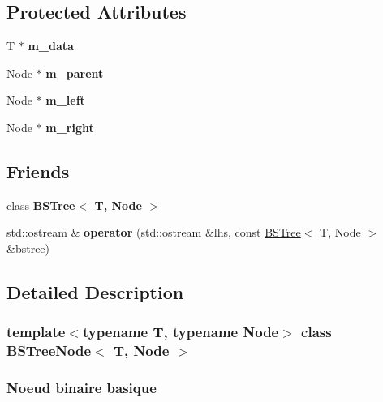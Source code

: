 \subsection*{Protected Attributes}
\begin{DoxyCompactItemize}
\item 
\mbox{\label{classBSTreeNode_a90e1d54d52717e3fe774178a05d46b85}} 
T $\ast$ {\bfseries m\+\_\+data}
\item 
\mbox{\label{classBSTreeNode_a44da72e439fe5ced0255f09bfd2d05b4}} 
Node $\ast$ {\bfseries m\+\_\+parent}
\item 
\mbox{\label{classBSTreeNode_a5fe5a7c75b5f4d5dc3f853d1c1b2e7e1}} 
Node $\ast$ {\bfseries m\+\_\+left}
\item 
\mbox{\label{classBSTreeNode_a3e9c2232d64f5ba0a1e77782832ada3a}} 
Node $\ast$ {\bfseries m\+\_\+right}
\end{DoxyCompactItemize}
\subsection*{Friends}
\begin{DoxyCompactItemize}
\item 
\mbox{\label{classBSTreeNode_a73f30f7d205b76caf0f18c05ea1ee795}} 
class {\bfseries B\+S\+Tree$<$ T, Node $>$}
\item 
\mbox{\label{classBSTreeNode_a1e8a7cc184833a959c0e8139756c22a7}} 
std\+::ostream \& {\bfseries operator} (std\+::ostream \&lhs, const \hyperlink{classBSTree}{B\+S\+Tree}$<$ T, Node $>$ \&bstree)
\end{DoxyCompactItemize}


\subsection{Detailed Description}
\subsubsection*{template$<$typename T, typename Node$>$\newline
class B\+S\+Tree\+Node$<$ T, Node $>$}

\subsubsection*{Noeud binaire basique }

